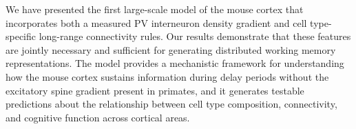 \documentclass[11pt]{article}
\begin{document}
We have presented the first large-scale model of the mouse cortex that incorporates both a measured PV interneuron density gradient and cell type-specific long-range connectivity rules. Our results demonstrate that these features are jointly necessary and sufficient for generating distributed working memory representations. The model provides a mechanistic framework for understanding how the mouse cortex sustains information during delay periods without the excitatory spine gradient present in primates, and it generates testable predictions about the relationship between cell type composition, connectivity, and cognitive function across cortical areas.



\end{document}
